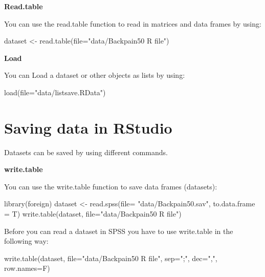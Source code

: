 \documentclass[
]{book}
\newenvironment{Shaded}{\begin{snugshade}}{\end{snugshade}}
\newcommand{\AttributeTok}[1]{\textcolor[rgb]{0.77,0.63,0.00}{#1}}
\newcommand{\FunctionTok}[1]{\textcolor[rgb]{0.00,0.00,0.00}{#1}}
\newcommand{\NormalTok}[1]{#1}
\newcommand{\OtherTok}[1]{\textcolor[rgb]{0.56,0.35,0.01}{#1}}
\newcommand{\StringTok}[1]{\textcolor[rgb]{0.31,0.60,0.02}{#1}}
\begin{document}
\textbf{Read.table}

You can use the read.table function to read in matrices and data frames by using:

\begin{Shaded}
\begin{Highlighting}[]
\NormalTok{dataset }\OtherTok{\textless{}{-}} \FunctionTok{read.table}\NormalTok{(}\AttributeTok{file=}\StringTok{"data/Backpain50 R file"}\NormalTok{)}
\end{Highlighting}
\end{Shaded}

\textbf{Load}

You can Load a dataset or other objects as lists by using:

\begin{Shaded}
\begin{Highlighting}[]
\FunctionTok{load}\NormalTok{(}\AttributeTok{file=}\StringTok{"data/listsave.RData"}\NormalTok{)}
\end{Highlighting}
\end{Shaded}

\hypertarget{saving-data-in-rstudio}{%
\section{Saving data in RStudio}\label{saving-data-in-rstudio}}

Datasets can be saved by using different commands.

\textbf{write.table}

You can use the write.table function to save data frames (datasets):

\begin{Shaded}
\begin{Highlighting}[]
\FunctionTok{library}\NormalTok{(foreign)}
\NormalTok{dataset }\OtherTok{\textless{}{-}} \FunctionTok{read.spss}\NormalTok{(}\AttributeTok{file=} \StringTok{"data/Backpain50.sav"}\NormalTok{, }\AttributeTok{to.data.frame =}\NormalTok{ T)}
\FunctionTok{write.table}\NormalTok{(dataset, }\AttributeTok{file=}\StringTok{"data/Backpain50 R file"}\NormalTok{)}
\end{Highlighting}
\end{Shaded}

Before you can read a dataset in SPSS you have to use write.table in the following way:

\begin{Shaded}
\begin{Highlighting}[]
\FunctionTok{write.table}\NormalTok{(dataset, }\AttributeTok{file=}\StringTok{"data/Backpain50 R file"}\NormalTok{, }\AttributeTok{sep=}\StringTok{";"}\NormalTok{, }\AttributeTok{dec=}\StringTok{","}\NormalTok{, }\AttributeTok{row.names=}\NormalTok{F)}
\end{Highlighting}
\end{Shaded}
\end{document}
